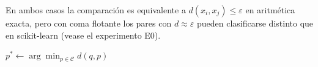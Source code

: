 \documentclass[11pt]{article}
\begin{document}
\noindent En ambos casos la comparaci\'on es equivalente a $d(x_i,x_j)\le
\varepsilon$ en aritm\'etica exacta, pero con coma flotante los pares con
$d\approx\varepsilon$ pueden clasificarse distinto que en scikit-learn
(vease el experimento E0).

\begin{algorithm}[H]
\caption{Asignaci\'on de una instancia nueva (dise\~no, a\'un no implementado)}
$p^\ast \leftarrow \arg\min_{p\in\mathcal{C}} d(q,p)$\;
\end{algorithm}
\end{document}
